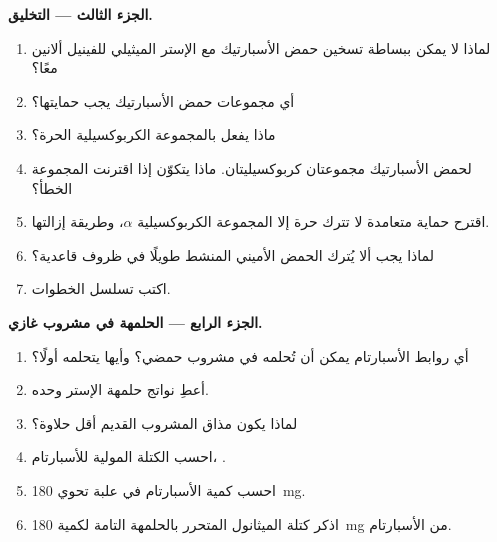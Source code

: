 \begin{problem}
\medskip
\noindent\textbf{الجزء الثالث --- التخليق.}
\begin{enumerate}[resume]
  \item لماذا لا يمكن ببساطة تسخين حمض الأسبارتيك مع الإستر الميثيلي للفينيل ألانين معًا؟
  \item أي مجموعات حمض الأسبارتيك يجب حمايتها؟
  \item ماذا يفعل  بالمجموعة الكربوكسيلية الحرة؟
  \item لحمض الأسبارتيك مجموعتان كربوكسيليتان. ماذا يتكوّن إذا اقترنت المجموعة الخطأ؟
  \item اقترح حماية متعامدة لا تترك حرة إلا المجموعة الكربوكسيلية $\alpha$، وطريقة
        إزالتها.
  \item لماذا يجب ألا يُترك الحمض الأميني المنشط طويلًا في ظروف قاعدية؟
  \item اكتب تسلسل الخطوات.
\end{enumerate}

\medskip
\noindent\textbf{الجزء الرابع --- الحلمهة في مشروب غازي.}
\begin{enumerate}[resume]
  \item أي روابط الأسبارتام يمكن أن تُحلمه في مشروب حمضي؟ وأيها يتحلمه أولًا؟
  \item أعطِ نواتج حلمهة الإستر وحده.
  \item لماذا يكون مذاق المشروب القديم أقل حلاوة؟
  \item احسب الكتلة المولية للأسبارتام، .
  \item احسب كمية الأسبارتام في علبة تحوي \qty{180}{mg}.
  \item اذكر كتلة الميثانول المتحرر بالحلمهة التامة لكمية \qty{180}{mg} من
        الأسبارتام.
\end{enumerate}
\end{problem}
